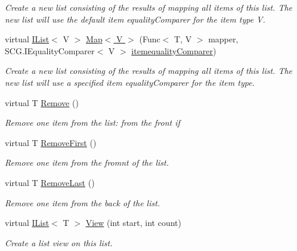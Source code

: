 \begin{DoxyCompactItemize}
\begin{DoxyCompactList}\small\item\em Create a new list consisting of the results of mapping all items of this list. The new list will use the default item equality\+Comparer for the item type V. \end{DoxyCompactList}\item 
virtual \hyperlink{interface_c5_1_1_i_list}{I\+List}$<$ V $>$ \hyperlink{class_c5_1_1_hashed_array_list_a560e362c78363db5884315caaa4dd40a}{Map$<$ V $>$} (Func$<$ T, V $>$ mapper, S\+C\+G.\+I\+Equality\+Comparer$<$ V $>$ \hyperlink{class_c5_1_1_collection_base_a95e343400be0e8f3f8d6310f1aaf2cc6}{itemequality\+Comparer})
\begin{DoxyCompactList}\small\item\em Create a new list consisting of the results of mapping all items of this list. The new list will use a specified item equality\+Comparer for the item type. \end{DoxyCompactList}\item 
virtual T \hyperlink{class_c5_1_1_hashed_array_list_a36ab8321ad505bf9780d39a41d419f31}{Remove} ()
\begin{DoxyCompactList}\small\item\em Remove one item from the list\+: from the front if \end{DoxyCompactList}\item 
virtual T \hyperlink{class_c5_1_1_hashed_array_list_a569ec3b1a5fc7ab16bf6fc6eac5a2977}{Remove\+First} ()
\begin{DoxyCompactList}\small\item\em Remove one item from the fromnt of the list. \end{DoxyCompactList}\item 
virtual T \hyperlink{class_c5_1_1_hashed_array_list_a3d58befa5b2087abe708a3c76ecdda88}{Remove\+Last} ()
\begin{DoxyCompactList}\small\item\em Remove one item from the back of the list. \end{DoxyCompactList}\item 
virtual \hyperlink{interface_c5_1_1_i_list}{I\+List}$<$ T $>$ \hyperlink{class_c5_1_1_hashed_array_list_ad454b187e01388a575e68f6dfeb8c9b5}{View} (int start, int count)
\begin{DoxyCompactList}\small\item\em Create a list view on this list. \end{DoxyCompactList}\item 

\end{DoxyCompactItemize}
